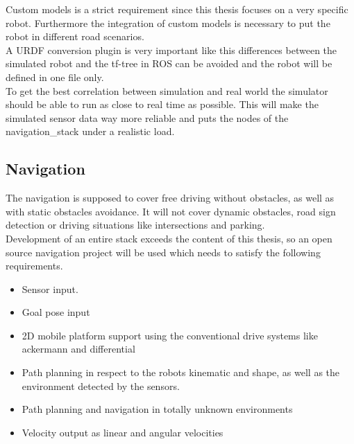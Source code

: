 Custom models is a strict requirement since this thesis focuses on a very specific robot. Furthermore the integration of custom models is necessary to put the robot in different road scenarios.\\

A URDF conversion plugin is very important like this differences between the simulated robot and the tf-tree in ROS can be avoided and the robot will be defined in one file only.\\

To get the best correlation between simulation and real world the simulator should be able to run as close to real time as possible. This will make the simulated sensor data way more reliable and puts the nodes of the navigation\_stack under a realistic load.

\subsection{Navigation}
The navigation is supposed to cover free driving without obstacles, as well as with static obstacles avoidance. It will not cover dynamic obstacles, road sign detection or driving situations like intersections and parking.\\

Development of an entire stack exceeds the content of this thesis, so an open source navigation project will be used which needs to satisfy the following requirements.
\begin{itemize}
	\item Sensor input.
	\item Goal pose input
	\item 2D mobile platform support using the conventional drive systems like ackermann and differential
	\item Path planning in respect to the robots kinematic and shape, as well as the environment detected by the sensors.
	\item Path planning and navigation in totally unknown environments
	\item Velocity output as linear and angular velocities
\end{itemize}

